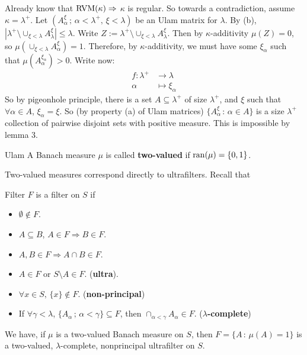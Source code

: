 \documentclass{article}
\begin{document}
\proof Already know that $\operatorname{RVM}(\kappa) \Rightarrow$ $\kappa$ is regular. So towards a contradiction, assume $\kappa=\lambda^{+}$. Let $(A_{\alpha}^{\xi} \,; \, \alpha<\lambda^{+}, \, \xi < \lambda)$ be an Ulam matrix for $\lambda$. By (b), $\left| \lambda^{+}\setminus \cup_{\xi < \lambda} A_{\lambda}^{\xi}\right| \leq \lambda$. Write $Z:=\lambda^{+}\setminus \cup_{\xi < \lambda} A_{\lambda}^{\xi}$. \gap
Then by $\kappa$-additivity $\mu(Z)=0$, so $\mu(\cup_{\xi <\lambda} A_{\alpha}^{\xi})=1$. Therefore, by $\kappa$-additivity, we must have some $\xi_{\alpha}$ such that $\mu(A_{\alpha}^{\xi_{\alpha}})>0$. Write now: \begin{align*}
    f: \lambda^{+} &\rightarrow \lambda\\ 
    \alpha &\mapsto \xi_{\alpha}
\end{align*}
So by pigeonhole principle, there is a set $A \subseteq \lambda^{+}$ of size $\lambda^{+}$, and $\xi$ such that $\forall \alpha \in A$, $\xi_{\alpha} = \xi$. So (by property (a) of Ulam matrices) $\{A_{\alpha}^{\xi} \, : \, \alpha \in A\}$ is a size $\lambda^{+}$ collection of pairwise disjoint sets with positive measure. This is impossible by lemma 3. \endproof 
\begin{fancydefine}{Ulam}
    A Banach measure $\mu$ is called \textbf{two-valued} if $\operatorname{ran}(\mu)= \{0,1\}$.
\end{fancydefine}
Two-valued measures correspond directly to ultrafilters. Recall that \begin{fancydefine}{Filter}
    $F$ is a filter on $S$ if \begin{itemize}
        \item $\emptyset \notin F$.
        \item $A \subseteq B$, $A \in F \Rightarrow B \in F$.
        \item $A,B \in F \Rightarrow A \cap B \in F$.
        \item $A \in F$ or $S\setminus A \in F$. (\textbf{ultra}).
        \item $\forall x \in S, \, \{x\} \notin F$. (\textbf{non-principal})
        \item If $\forall \gamma <\lambda$, $\{A_{\alpha} \, ; \, \alpha < \gamma \} \subseteq F$, then $\cap_{\alpha<\gamma} A_{\alpha} \in F$. ($\lambda$\textbf{-complete})
    \end{itemize}
\end{fancydefine}
We have, if $\mu$ is a two-valued Banach measure on $S$, then $ F = \{ A \, : \, \mu(A)=1\}$ is a two-valued, $\lambda$-complete, nonprincipal ultrafilter on $S$.
\end{document}

